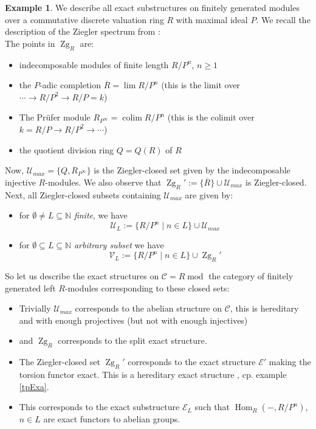 \documentclass[11pt,a4paper]{amsart}
\theoremstyle{plain}
\theoremstyle{definition}
\newtheorem{exa}[thm]{Example}
\DeclareMathOperator{\Hom}{Hom}
\DeclareMathOperator{\modu}{mod}
\DeclareMathOperator*{\colim}{colim}
\newcommand{\mcC}{\mathcal{C}}
\newcommand{\mcE}{\mathcal{E}}
\newcommand{\mcU}{\mathcal{U}}
\newcommand{\mcV}{\mathcal{V}}
\DeclareMathOperator{\Zg}{Zg}
\begin{document}
\begin{exa} 
We describe all exact substructures on finitely generated modules over a commutative discrete valuation ring $R$ with maximal ideal $P$.  We recall the description of the Ziegler spectrum from \cite[Section 5.2]{Pr}:\\
The points in $\Zg_R$ are:
\begin{itemize}
\item[(a)] indecomposable modules of finite length $R/P^n$, $n\geq 1$
\item[(b)] the $P$-adic completion $\overline{R}=\lim R/P^n$ (this is the limit over $\cdots \to R/P^{2} \to R/P=k$)
\item[(c)] The Pr\"ufer module $R_{P^{\infty}}=\colim R/P^n$ (this is the colimit over $k=R/P \to R/P^2 \to \cdots $)
\item[(d)] the quotient division ring $Q=Q(R)$ of $R$
\end{itemize}
Now, $\mcU_{max}=\{Q, R_{P^{\infty}}\}$ is the Ziegler-closed set given by the indecomposable injective $R$-modules. We also observe that $\Zg_R':=\{\overline{R}\}\cup \mcU_{max}$ is Ziegler-closed.\\
Next, all Ziegler-closed subsets containing $\mcU_{max}$ are given by: 
\begin{itemize}
\item[(1)] for $\emptyset \neq L\subseteq \mathbb{N}$ \emph{finite}, we have 
\[
\mcU_L:=\{R/P^n \mid n \in L\} \cup \mcU_{max}
\]
\item[(2)] for $\emptyset \subseteq L\subseteq \mathbb{N}$ \emph{arbitrary subset} we have 
\[
\mcV_L:=\{R/P^n \mid n \in L\} \cup \Zg_R' 
\]
\end{itemize}
So let us describe the exact structures on $\mcC=R\modu$ the category of finitely generated left $R$-modules corresponding to these closed sets: 
\begin{itemize}
    \item[(max)] Trivially $\mcU_{max}$ corresponds to the abelian structure on $\mcC$, this is hereditary and with enough projectives (but not with enough injectives) 
    \item[(min)] and $\Zg_R$ corresponds to the split exact structure. 
    \item[($\Zg$')] The Ziegler-closed set $\Zg_R'$ corresponds to the exact structure $\mcE'$ making the torsion functor exact. This is a hereditary exact structure , cp. example \ref{tpExa}.
    \item[($\mcU_L$)] This corresponds to the exact substructure $\mcE_L$ such that $\Hom_R(-,R/P^n)$, $n \in L$ are exact functors to abelian groups. 

\end{itemize}
\end{exa}
\end{document}
